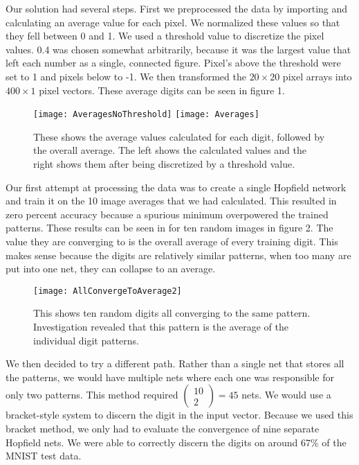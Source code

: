 \documentclass[]{article}
\theoremstyle{plain}
\theoremstyle{definition}
\begin{document}
\quad Our solution had several steps. First we preprocessed the data by importing and calculating an average value for each pixel. We normalized these values so that they fell between 0 and 1. We used a threshold value to discretize the pixel values. 0.4 was chosen somewhat arbitrarily, because it was the largest value that left each number as a single, connected figure. Pixel's above the threshold were set to 1 and pixels below to -1. We then transformed the $ 20\times20 $ pixel arrays into $ 400\times 1 $ pixel vectors. These average digits can be seen in figure 1. 

\begin{figure}[h]
\centering
\texttt{[image: AveragesNoThreshold]}
\texttt{[image: Averages]}
\caption{These shows the average values calculated for each digit, followed by the overall average. The left shows the calculated values and the right shows them after being discretized by a threshold value.}
\end{figure}
Our first attempt at processing the data was to create a single Hopfield network and train it on the 10 image averages that we had calculated. This resulted in zero percent accuracy because a spurious minimum overpowered the trained patterns. These results can be seen in for ten random images in figure 2. The value they are converging to is the overall average of every training digit. This makes sense because the digits are relatively similar patterns, when too many are put into one net, they can collapse to an average. 

\begin{figure}[h]
\centering
\texttt{[image: AllConvergeToAverage2]}
\caption{This shows ten random digits all converging to the same pattern. Investigation revealed that this pattern is the average of the individual digit patterns.}
\end{figure}

We then decided to try a different path. Rather than a single net that stores all the patterns, we would have multiple nets where each one was responsible for only two patterns. This method required $ \left(\begin{array}{c}
10\\2
\end{array}\right) = 45 $ nets. We would use a bracket-style system to discern the digit in the input vector. Because we used this bracket method, we only had to evaluate the convergence of nine separate Hopfield nets. We were able to correctly discern the digits on around 67\% of the MNIST test data. 
\end{document}
